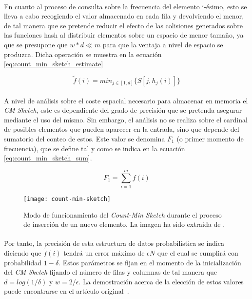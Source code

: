 \documentclass{subfiles}
\begin{document}
      \paragraph{}
      En cuanto al proceso de consulta sobre la frecuencia del elemento i-ésimo, esto se lleva a cabo recogiendo el valor almacenado en cada fila y devolviendo el menor, de tal manera que se pretende reducir el efecto de las colisiones generados sobre las funciones hash al distribuir elementos sobre un espacio de menor tamaño, ya que se presupone que $w * d \ll m$ para que la ventaja a nivel de espacio se produzca. Dicha operación se muestra en la ecuación \eqref{eq:count_min_sketch_estimate}

      \begin{equation}
      \label{eq:count_min_sketch_estimate}
        \widetilde{f}(i) = min_{j \in [1,d]}\{S[j, h_j(i)]\}
      \end{equation}

      \paragraph{}
      A nivel de análisis sobre el coste espacial necesario para almacenar en memoria el \emph{CM Sketch}, este es dependiente del grado de precisión que se pretenda asegurar mediante el uso del mismo. Sin embargo, el análisis no se realiza sobre el cardinal de posibles elementos que pueden aparecer en la entrada, sino que depende del sumatorio del conteo de estos. Este valor se denomina $F_1$ (o primer momento de frecuencia), que se define tal y como se indica en la ecuación \eqref{eq:count_min_sketch_sum}.

      \begin{equation}
      \label{eq:count_min_sketch_sum}
        F_1 = \sum_{i=1}^m f(i)
      \end{equation}

      \begin{figure}
        \centering
        \texttt{[image: count-min-sketch]}
        \caption{Modo de funcionamiento del \emph{Count-Min Sketch} durante el proceso de inserción de un nuevo elemento. La imagen ha sido extraida de \cite{cormode2005improved}.}
        \label{fig:count_min_sketch}
      \end{figure}

      \paragraph{}
      Por tanto, la precisión de esta estructura de datos probabilística se indica diciendo que $\widetilde{f}(i)$ tendrá un error máximo de $\epsilon N$ que el cual se cumplirá con probabilidad $1-\delta$. Estos parámetros se fijan en el momento de la inicialización del \emph{CM Sketch} fijando el número de filas y columnas de tal manera que $d = log(1/\delta)$ y $w=2/\epsilon$. La demostración acerca de la elección de estos valores puede encontrarse en el artículo original \cite{cormode2005improved}.
\end{document}
